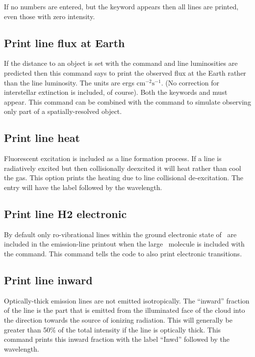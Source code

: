 If no numbers are entered, but the keyword  appears then all lines
are printed, even those with zero intensity.

\subsection{Print line flux at Earth}
\label{sec:line:flux:earth}

If the distance to an object is set with the
 command and line luminosities are predicted
then this command says to print the observed
flux at the Earth rather than the line luminosity.
The units are ergs cm$^{-2}\mathrm{s}^{-1}$.
(No correction for interstellar extinction is included, of course).
Both the keywords  and  must appear.
This command can be
combined with the 
command to simulate observing only part of
a spatially-resolved object.

\subsection{Print line heat}

Fluorescent excitation is included as a line formation process.
If a line is radiatively excited but then collisionally deexcited
it will heat rather than cool the gas.
This option prints the heating due to line
collisional de-excitation.
The entry will have the label  followed
by the wavelength.

\subsection{Print line H2 electronic}

By default only ro-vibrational lines within the ground electronic state
of \htwo\ are included in the emission-line printout when the
large \htwo\ molecule
is included with the  command.
This command
tells the code to also print electronic transitions.

\subsection{Print line inward}

Optically-thick emission lines are not emitted isotropically.
The
``inward'' fraction of the line is the part that is emitted from the
illuminated face of the cloud into the direction towards the source of
ionizing radiation.
This will generally be greater than 50\% of the total
intensity if the line is optically thick.
This command prints this inward
fraction with the label ``Inwd'' followed by the wavelength.


